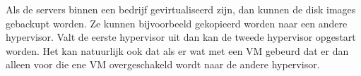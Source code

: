 Als de servers binnen een bedrijf gevirtualiseerd zijn, dan kunnen de disk images gebackupt worden. Ze kunnen bijvoorbeeld gekopieerd worden naar een andere hypervisor. Valt de eerste hypervisor uit dan kan de tweede hypervisor opgestart worden. Het kan natuurlijk ook dat als er wat met een VM gebeurd dat er dan alleen voor die ene VM overgeschakeld wordt naar de andere hypervisor.

